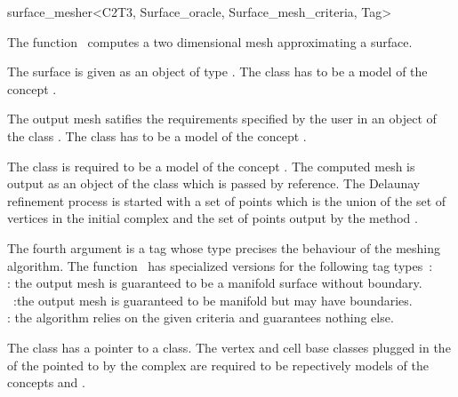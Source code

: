 

\begin{ccRefFunction}{surface_mesher<C2T3, Surface_oracle,
Surface_mesh_criteria, Tag>}  %


\ccDefinition
  
The function \ccRefName\ computes a two dimensional mesh 
approximating  a surface.

The surface is given as an object of type .
The class 
has to be a model of the concept .

The output mesh satifies the requirements specified by the user
in an object of the class .
The class  has to be
a model of the concept .

 The class 
is required to be a model of the concept
.
The  computed  mesh is output as an object  of the class 
which is passed by reference.
The Delaunay refinement
process is started with a set of points which is the union of the
set of vertices in the initial complex  and the set of
points output by the method .

The fourth argument is a tag whose type precises the behaviour of the
meshing algorithm. The function \ccRefName\  has specialized versions
for the following  tag types~: \\
 : the output mesh is guaranteed to be a manifold
surface without boundary.\\
~:the output mesh is guaranteed to be
manifold but may have boundaries.\\
 : the algorithm relies on the given criteria and
guarantees nothing else.

The class  has a pointer to 
a  class.
The vertex and cell base classes plugged 
in the  of the
 pointed to by the 
complex are required  to be repectively  models  of the concepts 
 and 
.


\end{ccRefFunction}
